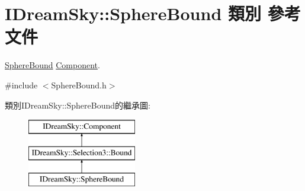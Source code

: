 \hypertarget{class_i_dream_sky_1_1_sphere_bound}{}\section{I\+Dream\+Sky\+:\+:Sphere\+Bound 類別 參考文件}
\label{class_i_dream_sky_1_1_sphere_bound}


\hyperlink{class_i_dream_sky_1_1_sphere_bound}{Sphere\+Bound} \hyperlink{class_i_dream_sky_1_1_component}{Component}.  




{\ttfamily \#include $<$Sphere\+Bound.\+h$>$}

類別\+I\+Dream\+Sky\+:\+:Sphere\+Bound的繼承圖\+:\begin{figure}[H]
\begin{center}
\leavevmode
\includegraphics[height=3.000000cm]{class_i_dream_sky_1_1_sphere_bound}
\end{center}
\end{figure}

